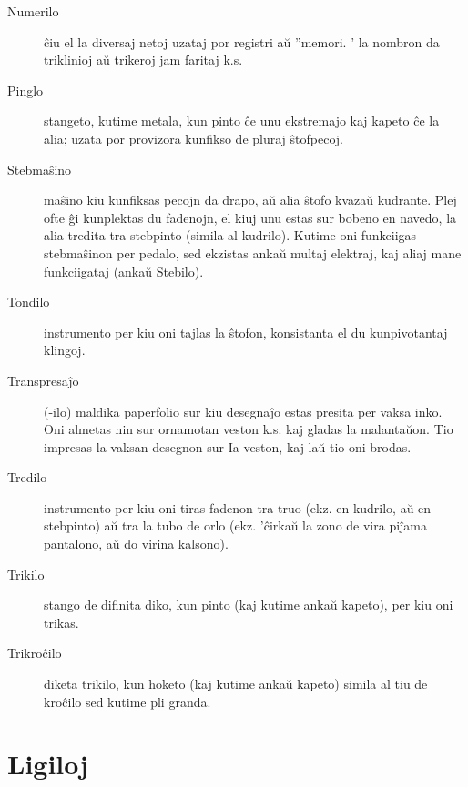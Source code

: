 \begin{description}
\item[Numerilo]

 ĉiu el la diversaj netoj uzataj por registri aŭ ''memori. ' la nombron da triklinioj aŭ trikeroj jam faritaj k.s.

\item[Pinglo]

 stangeto, kutime metala, kun pinto ĉe unu ekstremajo kaj kapeto ĉe la alia; uzata por provizora kunfikso de pluraj ŝtofpecoj.

\item[Stebmaŝino]

 maŝino kiu kunfiksas pecojn da drapo, aŭ alia ŝtofo kvazaŭ kudrante. Plej ofte ĝi kunplektas du fadenojn, el kiuj unu estas sur bobeno en navedo, la alia tredita tra stebpinto (simila al kudrilo). Kutime oni funkciigas stebmaŝinon per pedalo, sed ekzistas ankaŭ multaj elektraj, kaj aliaj mane funkciigataj (ankaŭ Stebilo).

\item[Tondilo]

 instrumento per kiu oni tajlas la ŝtofon, konsistanta el du kunpivotantaj klingoj.

\item[Transpresaĵo]

 (-ilo) maldika paperfolio sur kiu desegnaĵo estas presita per vaksa inko. Oni almetas nin sur ornamotan veston k.s. kaj gladas la malantaŭon. Tio impresas la vaksan desegnon sur Ia veston, kaj laŭ tio oni brodas.

\item[Tredilo]

 instrumento per kiu oni tiras fadenon tra truo (ekz. en kudrilo, aŭ en stebpinto) aŭ tra la tubo de orlo (ekz. 'ĉirkaŭ la zono de vira piĵama pantalono, aŭ do virina kalsono).

\item[Trikilo]

 stango de difinita diko, kun pinto (kaj kutime ankaŭ kapeto), per kiu oni trikas.

\item[Trikroĉilo]

 diketa trikilo, kun hoketo (kaj kutime ankaŭ kapeto) simila al tiu de kroĉilo sed kutime pli granda.
\end{description}

\section[Ligiloj]{Ligiloj}
\hypertarget{Ligiloj}{}
\label{Ligiloj}



